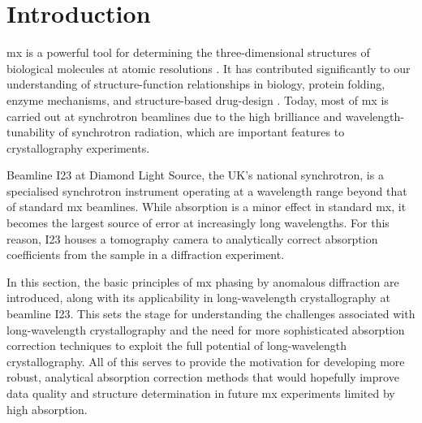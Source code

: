 \section{Introduction}


\ac{mx} is a powerful tool for determining the three-dimensional structures of biological molecules at atomic resolutions \cite{Gorrec2021}. It has contributed significantly to our understanding of structure-function relationships in biology, protein folding, enzyme mechanisms, and structure-based drug-design \cite{Foerster2019}. Today, most of \ac{mx} is carried out at synchrotron beamlines due to the high brilliance and wavelength-tunability of synchrotron radiation, which are important features to crystallography experiments.

Beamline I23 at Diamond Light Source, the UK's national synchrotron, is a specialised synchrotron instrument operating at a wavelength range beyond that of standard \ac{mx} beamlines. While absorption is a minor effect in standard \ac{mx}, it becomes the largest source of error at increasingly long wavelengths. For this reason, I23 houses a tomography camera to analytically correct absorption coefficients from the sample in a diffraction experiment.


In this section, the basic principles of \ac{mx} phasing by anomalous diffraction are introduced, along with its applicability in long-wavelength crystallography at beamline I23. This sets the stage for understanding the challenges associated with long-wavelength crystallography and the need for more sophisticated absorption correction techniques to exploit the full potential of long-wavelength crystallography. %
All of this serves to provide the motivation for developing more robust, analytical absorption correction methods that would hopefully improve data quality and structure determination in future \ac{mx} experiments limited by high absorption.

